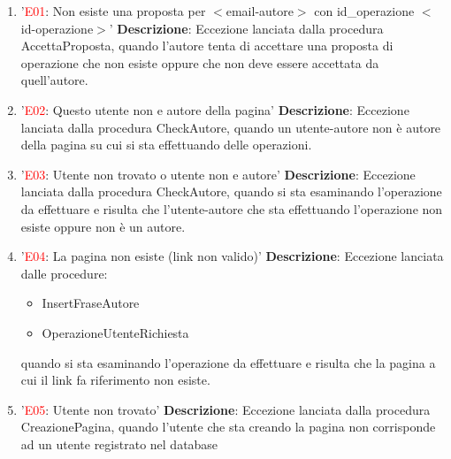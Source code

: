 \begin{enumerate}[label=\textbf{\arabic*.}]
    \item '\textcolor{red}{E01}: Non esiste una proposta per $<$email-autore$>$ con id\_operazione $<$id-operazione$>$'\newline\newline
    \textbf{Descrizione}: Eccezione lanciata dalla procedura AccettaProposta, quando l'autore tenta di accettare una proposta di operazione che non esiste oppure che non deve essere accettata da quell'autore.

    \item '\textcolor{red}{E02}: Questo utente non e autore della pagina'\newline\newline
    \textbf{Descrizione}: Eccezione lanciata dalla procedura CheckAutore, quando un utente-autore non è autore della pagina su cui si sta effettuando delle operazioni.
    
    \item '\textcolor{red}{E03}: Utente non trovato o utente non e autore'\newline\newline
    \textbf{Descrizione}: Eccezione lanciata dalla procedura CheckAutore, quando si sta esaminando l'operazione da effettuare e risulta che l'utente-autore che sta effettuando l'operazione non esiste oppure non è un autore.
    
    \item '\textcolor{red}{E04}: La pagina non esiste (link non valido)'\newline\newline
    \textbf{Descrizione}: Eccezione lanciata dalle procedure:
    \begin{itemize}
        \item InsertFraseAutore
        \item OperazioneUtenteRichiesta
    \end{itemize}
    quando si sta esaminando l'operazione da effettuare e risulta che la pagina a cui il link fa riferimento non esiste.
    
    \item '\textcolor{red}{E05}: Utente non trovato'\newline\newline
    \textbf{Descrizione}: Eccezione lanciata dalla procedura CreazionePagina, quando l'utente che sta creando la pagina non corrisponde ad un utente registrato nel database


\end{enumerate}
